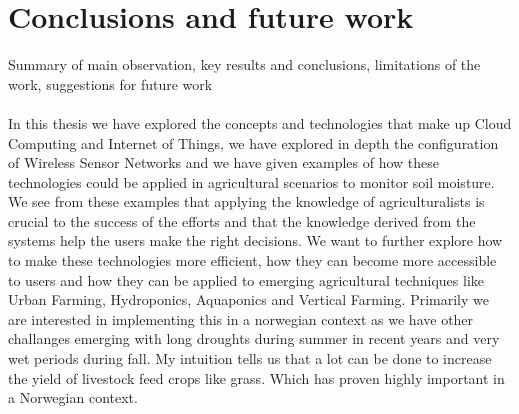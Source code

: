\documentclass[]{uiophd}
\begin{document}
\chapter{Conclusions and future work}

Summary of main observation, key results and conclusions, limitations of the work, suggestions for future work
\\\\
In this thesis we have explored the concepts and technologies that make up Cloud Computing and Internet of Things, we have explored in depth the configuration of Wireless Sensor Networks and we have given examples of how these technologies could be applied in agricultural scenarios to monitor soil moisture. We see from these examples that applying the knowledge of agriculturalists is crucial to the success of the efforts and that the knowledge derived from the systems help the users make the right decisions. We want to further explore how to make these technologies more efficient, how they can become more accessible to users and how they can be applied to emerging agricultural techniques like Urban Farming, Hydroponics, Aquaponics and Vertical Farming. Primarily we are interested in implementing this in a norwegian context as we have other challanges emerging with long droughts during summer in recent years and very wet periods during fall. My intuition tells us that a lot can be done to increase the yield of livestock feed crops like grass. Which has proven highly important in a Norwegian context.
\end{document}
